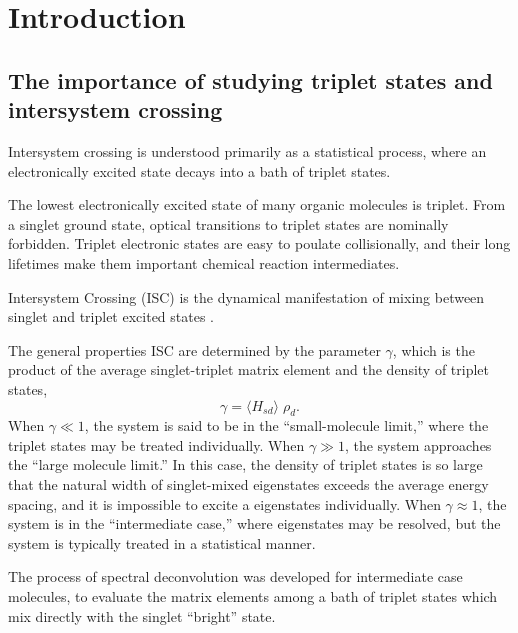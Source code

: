 \documentclass[12pt]{mitthesis}
\begin{document}
\tableofcontents
\clearpage

\chapter{Introduction}
\label{chapter:intro}

\section{The importance of studying triplet states and intersystem
  crossing}

Intersystem crossing is understood primarily as a statistical process,
where an electronically excited state decays into a bath of triplet states.

The lowest electronically excited state of many organic molecules is
triplet.  From a singlet ground state, optical transitions to triplet
states are nominally forbidden.  Triplet electronic states are easy to
poulate collisionally, and their long lifetimes make them important
chemical reaction intermediates.

Intersystem Crossing (ISC) is the dynamical manifestation of mixing
between singlet and triplet excited states \cite{kommandeur87,
  robinson67, tramer05}.

The general properties ISC are determined by the parameter $\gamma$,
which is the product of the average singlet-triplet matrix element and
the density of triplet states,
\begin{equation}
\gamma = \langle H_{sd} \rangle \; \rho_d.
\end{equation}
When $\gamma \ll 1$, the system is said to be in the ``small-molecule
limit,'' where the triplet states may be treated individually.  When
$\gamma \gg 1$, the system approaches the ``large molecule limit.''
In this case, the density of triplet states is so large that the
natural width of singlet-mixed eigenstates exceeds the average energy
spacing, and it is impossible to excite a eigenstates individually.
When $\gamma \approx 1$, the system is in the ``intermediate case,''
where eigenstates may be resolved, but the system is typically treated
in a statistical manner.

The process of spectral deconvolution was developed for intermediate
case molecules, to evaluate the matrix elements among a bath of
triplet states which mix directly with the singlet ``bright'' state.

\end{document}
